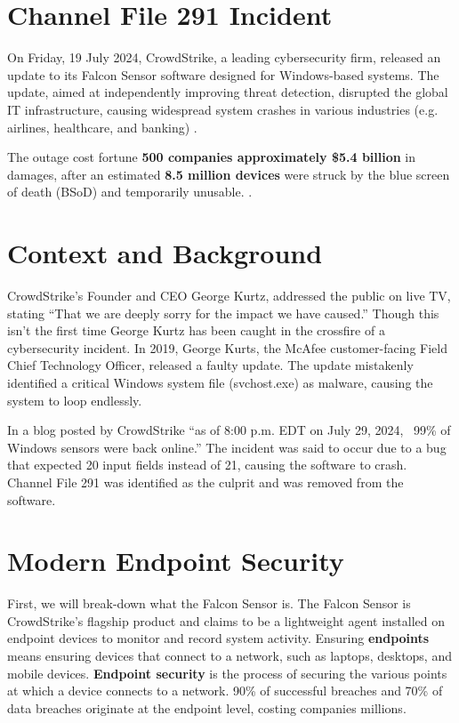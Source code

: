

\section{Channel File 291 Incident}
\label{sec:crowd}

On Friday, 19 July 2024, CrowdStrike, a leading cybersecurity firm, released an update to its Falcon Sensor
software designed for Windows-based systems. The update, aimed at independently improving threat detection,
disrupted the global IT infrastructure, causing widespread system crashes in various industries (e.g. airlines, healthcare, and banking) \cite{crowdstrike2024falcon}. 

The outage cost fortune \textbf{ 500 companies approximately \$5.4 billion} in damages, after an
estimated \textbf{8.5 million devices} were struck by the blue screen of death (BSoD) and temporarily unusable. \cite{tidy_crowdstrike_outage_2024}\cite{kerner_crowdstrike_outage_2024}.

\section{Context and Background}
\label{sec:context}

CrowdStrike's Founder and CEO George Kurtz, addressed the public on live TV, stating ``That we are deeply sorry for the impact we have caused.'' \cite{sato_crowdstrike_ceo_2024}
Though this isn't the first time George Kurtz has been caught in the crossfire of a cybersecurity incident.
In 2019, George Kurts, the McAfee customer-facing Field Chief Technology Officer, released a faulty update.
The update mistakenly identified a critical Windows system file (svchost.exe) as malware, causing the system to loop endlessly. \cite{volenik_crowdstrike_ceo_2024}

In a blog posted by CrowdStrike ``as of 8:00 p.m. EDT on July 29, 2024, ~99\% of Windows sensors were back online.'' \cite{crowdstrike_channel_file_291_2024}
The incident was said to occur due to a bug that expected 20 input fields instead of 21, causing the software to crash. Channel File 291 was identified as the culprit and was removed from the software. \cite{crowdstrike_channel_file_291_2024}

\section{Modern Endpoint Security}
\label{sec:falcon}

First, we will break-down what the Falcon Sensor is. The Falcon Sensor is CrowdStrike's flagship product and claims to be a lightweight agent installed on endpoint devices to monitor and record system activity.
Ensuring \textbf{endpoints} means ensuring devices that connect to a network, such as laptops, desktops, and mobile devices. \textbf{Endpoint security} is the process of securing the various points at which a device connects to a network. 90\% of successful breaches and 70\% of data breaches originate at the endpoint level,
costing companies millions. \cite{ibm_endpoint_security} 

